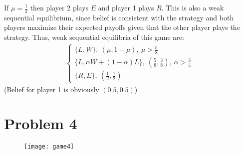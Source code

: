 \documentclass[a4paper]{article}
\begin{document}
If $\mu = \frac{1}{2}$ then player 2 plays $E$ and player 1 plays $R$. This is also a weak sequential equilibrium, since belief is consistent with the strategy and both players maximize their expected payoffs given that the other player plays the strategy.
Thus, weak sequential equilibria of this game are:
\begin{align*}
\begin{cases}
\{L, W\},\ (\mu, 1-\mu),\ \mu > \frac{5}{8}\\
\{L, \alpha W + (1 - \alpha) L\},\ (\frac{5}{8}, \frac{3}{8}),\ \alpha > \frac{3}{5}\\
\{R, E\},\ (\frac{1}{2}, \frac{1}{2})
\end{cases}
\end{align*}
(Belief for player 1 is obviously $(0.5, 0.5)$)

\section*{Problem 4}
\begin{figure}[H]
	\centering
	\texttt{[image: game4]}
	\caption{}\label{fig3}
\end{figure}
\end{document}
